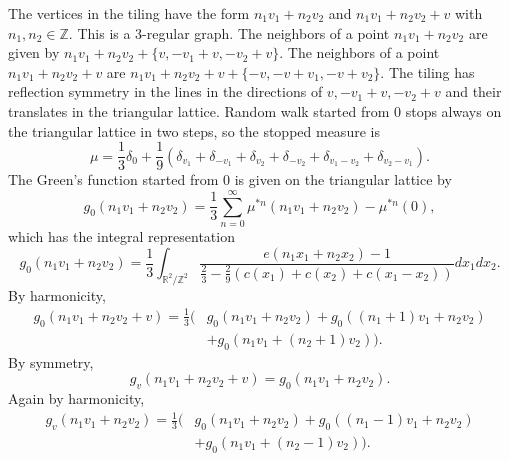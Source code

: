 \documentclass[a4paper, 12pt, notitlepage]{amsart}
\newcommand{\bR}{\mathbb{R}}
\newcommand{\zed}{\mathbb{Z}}
\theoremstyle{remark}
\begin{document}
The vertices in the tiling have the form $n_1v_1 + n_2v_2$ and $n_1 v_1 + n_2v_2 + v$ with $n_1, n_2 \in \zed$.  This is a 3-regular graph.  The neighbors of a point $n_1 v_1 + n_2 v_2$ are given by $n_1 v_1 + n_2 v_2 + \{v, -v_1 + v, -v_2 +v\}$.  The neighbors of a point $n_1 v_1 + n_2 v_2 + v$ are $n_1 v_1 + n_2 v_2 + v + \{-v, -v + v_1, -v + v_2 \}$. The tiling has reflection symmetry in the lines in the directions of $v, -v_1 + v, -v_2 + v$ and their translates in the triangular lattice.  Random walk started from 0 stops always on the triangular lattice in two steps, so the stopped measure is
\begin{equation}
 \mu = \frac{1}{3}\delta_0 + \frac{1}{9} \left(\delta_{v_1} + \delta_{-v_1} + \delta_{v_2} + \delta_{-v_2} + \delta_{v_1-v_2} + \delta_{v_2-v_1}\right).
\end{equation}
The Green's function started from 0 is given on the triangular lattice by
\begin{equation}
 g_0(n_1 v_1 + n_2 v_2) = \frac{1}{3} \sum_{n=0}^\infty \mu^{*n}(n_1v_1 + n_2v_2) - \mu^{*n}(0),
\end{equation}
which has the integral representation
\begin{equation}
 g_0(n_1v_1 + n_2v_2) = \frac{1}{3} \int_{\bR^2/\zed^2} \frac{e(n_1 x_1 + n_2 x_2)-1}{\frac{2}{3} - \frac{2}{9}\left(c(x_1) + c(x_2) + c(x_1-x_2) \right)}dx_1 dx_2.
\end{equation}
By harmonicity, 
\begin{align*}
 g_0(n_1v_1 + n_2 v_2 + v) = \frac{1}{3}(&g_0(n_1v_1 + n_2v_2) + g_0((n_1 + 1)v_1 + n_2 v_2)\\& + g_0(n_1 v_1 + (n_2+1)v_2) ).
\end{align*}
By symmetry,
\begin{equation}
 g_v(n_1v_1 + n_2 v_2 + v) = g_0(n_1 v_1 + n_2 v_2).
\end{equation}
Again by harmonicity,
\begin{align*}
 g_v(n_1v_1 + n_2v_2) = \frac{1}{3}(& g_0(n_1v_1 + n_2 v_2) + g_0((n_1 -1)v_1 + n_2v_2)\\
 &+ g_0(n_1v_1 + (n_2-1)v_2)).
\end{align*}
\end{document}
